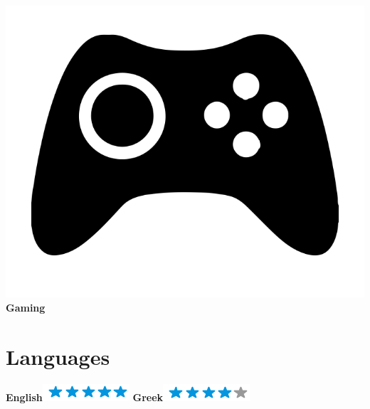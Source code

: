 \documentclass[]{friggeri-cv}
\begin{document}
\begin{aside}
        \includegraphics[scale=0.05]{img/gaming.png}
    \textbf{Gaming}
    ~
  \section{Languages}
    \textbf{English}\includegraphics[scale=0.40]{img/5stars.png}
    \textbf{Greek}\includegraphics[scale=0.40]{img/4stars.png}
\end{aside}
\end{document}

